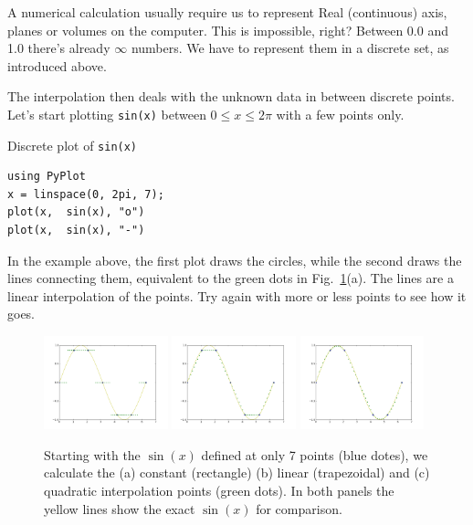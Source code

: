 A numerical calculation usually require us to represent Real (continuous) axis, planes or volumes on the computer. This is impossible, right? Between 0.0 and 1.0 there's already $\infty$ numbers. We have to represent them in a discrete set, as introduced above.

The interpolation then deals with the unknown data in between discrete points. Let's start plotting \texttt{sin(x)} between $0 \leq x \leq 2\pi$ with a few points only.

\begin{example}{Discrete plot of \texttt{sin(x)}}
\begin{verbatim}
using PyPlot
x = linspace(0, 2pi, 7);
plot(x,  sin(x), "o")
plot(x,  sin(x), "-")
\end{verbatim}
\end{example}

In the example above, the first plot draws the circles, while the second draws the lines connecting them, equivalent to the green dots in Fig.~\ref{fig:interp}(a). The lines are a linear interpolation of the points. Try again with more or less points to see how it goes.

\begin{figure}[ht!]
 \centering
 \includegraphics[width=0.32\textwidth,keepaspectratio=true]{./Interp0.png}
 \includegraphics[width=0.32\textwidth,keepaspectratio=true]{./Interp1.png}
 \includegraphics[width=0.32\textwidth,keepaspectratio=true]{./Interp2.png}
 \caption{Starting with the $\sin(x)$ defined at only 7 points (blue dotes), we calculate the (a) constant (rectangle) (b) linear (trapezoidal) and (c) quadratic interpolation points (green dots). In both panels the yellow lines show the exact $\sin(x)$ for comparison.}
 \label{fig:interp}
\end{figure}



